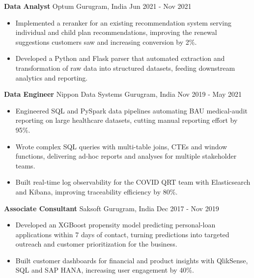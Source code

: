 \documentclass[10pt,a4paper]{article}
\newcommand{\role}[4]{\textbf{#1} \textbar{} #2 \hfill #3 \textbar{} #4\par}
\begin{document}
\vspace{3pt}
\role{Data Analyst}{Optum}{Gurugram, India}{Jun 2021 - Nov 2021}
\begin{itemize}
  \item Implemented a reranker for an existing recommendation system serving individual and child plan recommendations, improving the renewal suggestions customers saw and increasing conversion by 2\%.
  \item Developed a Python and Flask parser that automated extraction and transformation of raw data into structured datasets, feeding downstream analytics and reporting.
\end{itemize}
\vspace{3pt}
\role{Data Engineer}{Nippon Data Systems}{Gurugram, India}{Nov 2019 - May 2021}
\begin{itemize}
  \item Engineered SQL and PySpark data pipelines automating BAU medical-audit reporting on large healthcare datasets, cutting manual reporting effort by 95\%.
  \item Wrote complex SQL queries with multi-table joins, CTEs and window functions, delivering ad-hoc reports and analyses for multiple stakeholder teams.
  \item Built real-time log observability for the COVID QRT team with Elasticsearch and Kibana, improving traceability efficiency by 80\%.
\end{itemize}
\vspace{3pt}
\role{Associate Consultant}{Saksoft}{Gurugram, India}{Dec 2017 - Nov 2019}
\begin{itemize}
  \item Developed an XGBoost propensity model predicting personal-loan applications within 7 days of contact, turning predictions into targeted outreach and customer prioritization for the business.
  \item Built customer dashboards for financial and product insights with QlikSense, SQL and SAP HANA, increasing user engagement by 40\%.
\end{itemize}
\end{document}
